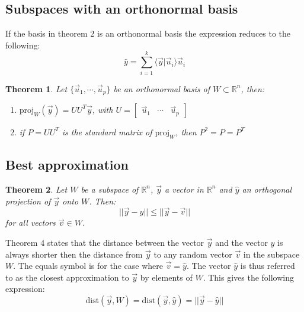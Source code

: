 \documentclass[11pt, a4paper]{article}
\newcommand*{\R}{\ensuremath{\mathbb{R}}}
\newtheorem{theorem}{Theorem}
\begin{document}
\subsection{Subspaces with an orthonormal basis}
If the basis in theorem 2 is an orthonormal basis the expression reduces to the following:
\begin{equation}
  \hat{y} = \sum_{i=1}^{k} \langle \vec{y} | \vec{u}_i \rangle \vec{u}_i
\end{equation}
\begin{theorem}
  Let $\{\vec{u}_1, \cdots, \vec{u}_p \}$ be an orthonormal basis of $W \subset \R^n$, then:
  \begin{enumerate}
  \item $\text{proj}_W(\vec{y}) = UU^T\vec{y}$, with $U = \begin{bmatrix} \vec{u}_1 & \cdots & \vec{u}_p  \end{bmatrix}$
  \item if $P = UU^T$ is the standard matrix of $\text{proj}_W$, then $P^2 = P = P^T$
  \end{enumerate}
\end{theorem}

\subsection{Best approximation}
\begin{theorem}
  Let $W$ be a subspace of $\R^n$, $\vec{y}$ a vector in $\R^n$ and $\hat{y}$ an orthogonal projection of $\vec{y}$ onto $W$. Then:
  \begin{equation}
    ||\vec{y} - \hat{y} || \leq || \vec{y} - \vec{v} ||
  \end{equation}
  for all vectors $\vec{v} \in W$.
\end{theorem}
Theorem 4 states that the distance between the vector $\vec{y}$ and the vector $\hat{y}$ is always shorter then the distance from $\vec{y}$ to any random vector $\vec{v}$ in the subspace $W$. The equals symbol is for the case where $\vec{v} = \hat{y}$. The vector $\hat{y}$ is thus referred to as the closest approximation to $\vec{y}$ by elements of $W$. This gives the following expression:
\begin{equation}
  \text{dist}(\vec{y}, W) = \text{dist}(\vec{y}, \hat{y}) = ||\vec{y} -\hat{y}||
\end{equation}
\end{document}
